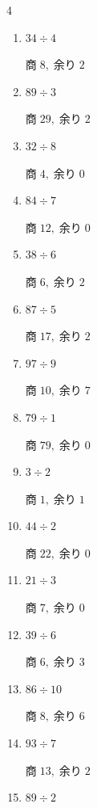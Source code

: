 \begin{multicols}{4}
\begin{enumerate}
        $商\; 12,\; 余り\; 1$

  \item $34 \div 4$

        $商\; 8,\; 余り\; 2$

  \item $89 \div 3$

        $商\; 29,\; 余り\; 2$

  \item $32 \div 8$

        $商\; 4,\; 余り\; 0$

  \item $84 \div 7$

        $商\; 12,\; 余り\; 0$

  \item $38 \div 6$

        $商\; 6,\; 余り\; 2$

  \item $87 \div 5$

        $商\; 17,\; 余り\; 2$

  \item $97 \div 9$

        $商\; 10,\; 余り\; 7$

  \item $79 \div 1$

        $商\; 79,\; 余り\; 0$

  \item $3 \div 2$

        $商\; 1,\; 余り\; 1$

  \item $44 \div 2$

        $商\; 22,\; 余り\; 0$

  \item $21 \div 3$

        $商\; 7,\; 余り\; 0$

  \item $39 \div 6$

        $商\; 6,\; 余り\; 3$

\columnbreak %

  \item $86 \div 10$

        $商\; 8,\; 余り\; 6$

  \item $93 \div 7$

        $商\; 13,\; 余り\; 2$

  \item $89 \div 2$


\end{enumerate}
\end{multicols}
